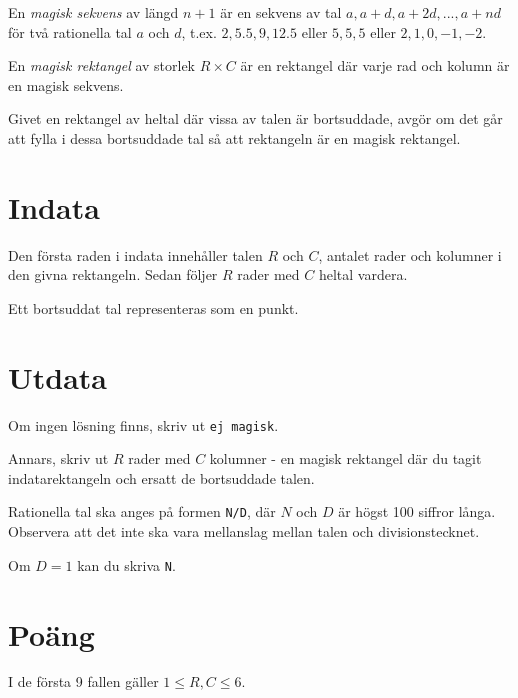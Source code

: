 
En \emph{magisk sekvens} av längd $n + 1$ är en sekvens av tal $a, a + d, a + 2d, ..., a + nd$ för två rationella tal $a$ och $d$, t.ex. $2, 5.5, 9, 12.5$ eller $5, 5, 5$ eller $2, 1, 0, -1, -2$.

En \emph{magisk rektangel} av storlek $R \times C$ är en rektangel där varje rad och kolumn är en magisk sekvens.

Givet en rektangel av heltal där vissa av talen är bortsuddade, avgör om det går att fylla i dessa bortsuddade tal så att rektangeln är en magisk rektangel.

\section*{Indata}
Den första raden i indata innehåller talen $R$ och $C$, antalet rader och kolumner i den givna rektangeln. Sedan följer $R$ rader med $C$ heltal vardera.

Ett bortsuddat tal representeras som en punkt.

\section*{Utdata}
Om ingen lösning finns, skriv ut \texttt{ej magisk}.

Annars, skriv ut $R$ rader med $C$ kolumner - en magisk rektangel där du tagit indatarektangeln och ersatt de bortsuddade talen.

Rationella tal ska anges på formen \texttt{N/D}, där $N$ och $D$ är högst 100 siffror långa. Observera att det inte ska vara mellanslag mellan talen och divisionstecknet.

Om $D = 1$ kan du skriva \texttt{N}.

\section*{Poäng}

I de första 9 fallen gäller $1 \le R, C \le 6$.

